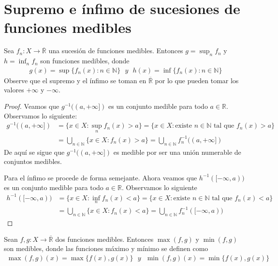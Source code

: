 \section{Supremo e ínfimo de sucesiones de funciones medibles}

\begin{prop}
    \label{prop:sup}
    Sea $f_n: X \longrightarrow \overline{\mathbb{R}}$ una sucesión de funciones medibles. Entonces $g = \sup_n{f_n}$ y $h = \inf_n{f_n}$ son funciones medibles, donde
    \begin{align*}
        g(x) = \sup{\{ f_n(x) : n \in \mathbb{N}\}} \ \ \ y  \ \ \ h(x) = \inf{\{ f_n(x) : n \in \mathbb{N}\}}
    \end{align*}
    Observe que el supremo y el ínfimo se toman en $\overline{\mathbb{R}}$ por lo que pueden tomar los valores $+\infty$ y $-\infty$.
\end{prop}

\begin{proof}
    Veamos que $g^{-1}((a,+\infty])$ es un conjunto medible para todo $a \in \mathbb{R}$. Observamos lo siguiente:
    \begin{align*}
        g^{-1}((a,+\infty]) & = \{ x \in X : \sup_n{f_n(x)} > a\} = \{ x \in X : \text{existe } n \in \mathbb{N} \text{ tal que }f_n(x) > a\} \\
                            & = \bigcup_{n \in \mathbb{N}}{\{ x \in X : f_n(x) > a \}} = \bigcup_{n \in \mathbb{N}}{f_n^{-1}((a,+\infty])}
    \end{align*}
    De aquí se sigue que $g^{-1}((a,+\infty])$ es medible por ser una unión numerable de conjuntos medibles.

    Para el ínfimo se procede de forma semejante. Ahora veamos que $h^{-1}([-\infty,a))$ es un conjunto medible para todo $a \in \mathbb{R}$. Observamos lo siguiente
    \begin{align*}
        h^{-1}([-\infty,a)) & = \{ x \in X : \inf_n{f_n(x)} < a\} = \{ x \in X : \text{existe } n \in \mathbb{N} \text{ tal que }f_n(x) < a\} \\
                            & = \bigcup_{n \in \mathbb{N}}{\{ x \in X : f_n(x) < a \}} = \bigcup_{n \in \mathbb{N}}{f_n^{-1}([-\infty,a))}
    \end{align*}
\end{proof}

\begin{cor}
    Sean $f,g: X \longrightarrow \overline{\mathbb{R}}$ dos funciones medibles. Entonces $\max(f,g)$ y $\min(f,g)$ son medibles, donde las funciones máximo y mínimo se definen como
    \begin{align*}
        \max(f,g)(x) = \max\{ f(x), g(x)\} \ \ \ y \ \ \ \min(f,g)(x) = \min\{ f(x), g(x)\}
    \end{align*}
\end{cor}

